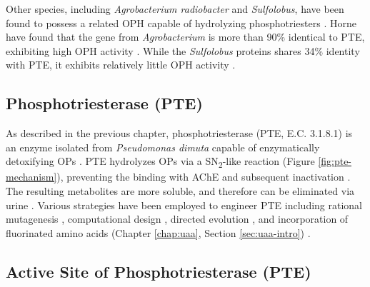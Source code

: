 \begin{refsection}
Other species, including \emph{Agrobacterium radiobacter} and
\emph{Sulfolobus}, have been found to possess a related OPH capable of
hydrolyzing phosphotriesters \cite{Horne2002,Porzio2007}. Horne 
have found that the gene from \emph{Agrobacterium} is more than 90\% identical
to PTE, exhibiting high OPH activity \cite{Horne2002}. While the
\emph{Sulfolobus} proteins shares 34\% identity with PTE, it exhibits
relatively little OPH activity \cite{Porzio2007}.

\subsection{Phosphotriesterase (PTE)}

As described in the previous chapter, phosphotriesterase (PTE, E.C. 3.1.8.1) is
an enzyme isolated from \emph{Pseudomonas dimuta} capable of enzymatically
detoxifying OPs \cite{
Lewis1988,Chen2007a,Mulbry1989,Benning2001a,Omburo1992a,Benning1995,Naqvi2014}.
PTE hydrolyzes OPs via a SN\textsubscript{2}-like reaction (Figure
\ref{fig:pte-mechanism}), preventing the binding with AChE and subsequent
inactivation \cite{Ghanem2005a}. The resulting metabolites are more soluble,
and therefore can be eliminated via urine \cite{Colovic2013b}. Various
strategies have been employed to engineer PTE including rational mutagenesis
\cite{Chen-Goodspeed2001a,Jackson2009a}, computational design
\cite{Pavelka2009,Yang2014a}, directed evolution \cite{Roodveldt2005}, and
incorporation of fluorinated amino acids (Chapter \ref{chap:uaa}, Section
\ref{sec:uaa-intro}) \cite{Yang2014a,Baker2011b}. 

\subsection{Active Site of Phosphotriesterase (PTE)}


\end{refsection}
